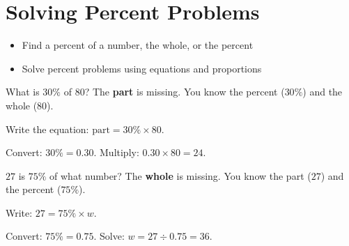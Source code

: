 \section{Solving Percent Problems}

\begin{stepGoal}
\begin{itemize}
    \item Find a percent of a number, the whole, or the percent
    \item Solve percent problems using equations and proportions
\end{itemize}
\end{stepGoal}

\begin{stepVocabBox}
\end{stepVocabBox}

\begin{stepsCard}
\end{stepsCard}

\begin{stepExample}{What is $30\%$ of $80$?}
     The \textbf{part} is missing. You know the percent ($30\%$) and the whole ($80$).

     Write the equation: $\text{part} = 30\% \times 80$.

     Convert: $30\% = 0.30$. Multiply: $0.30 \times 80 = 24$.
\end{stepExample}

\begin{stepExample}{$27$ is $75\%$ of what number?}
     The \textbf{whole} is missing. You know the part ($27$) and the percent ($75\%$).

     Write: $27 = 75\% \times w$.

     Convert: $75\% = 0.75$. Solve: $w = 27 \div 0.75 = 36$.
\end{stepExample}

